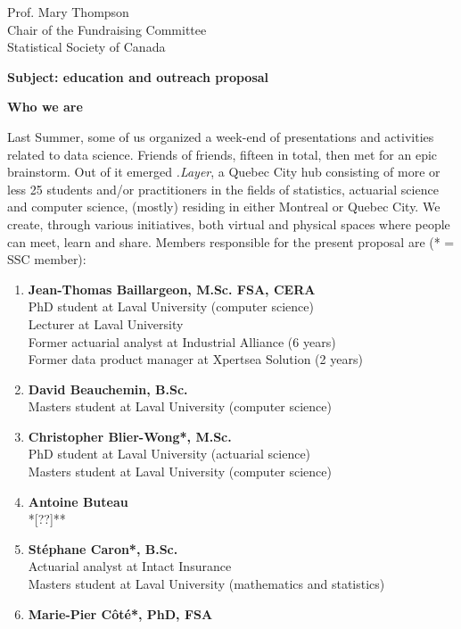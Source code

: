 \documentclass[11pt, a4paper]{letter} %
\begin{document}
\begin{letter}{
	Prof. Mary Thompson\\
	Chair of the Fundraising Committee\\
	Statistical Society of Canada
	
	\bigskip
	\textbf{Subject: education and outreach proposal}%
}
\bigskip
\noindent \textbf{Who we are}

Last Summer, some of us organized a week-end of presentations and activities related to data science. Friends of friends, fifteen in total, then met for an epic brainstorm. %
Out of it emerged \emph{.Layer}, a Quebec City hub consisting of more or less 25 students and/or practitioners in the fields of statistics, actuarial science and computer science, (mostly) residing in either Montreal or Quebec City. We create, through various initiatives, both virtual and physical spaces where people can meet, learn and share. Members responsible for the present proposal are (* = SSC member):
\begin{enumerate}
	\item[] \textbf{Jean-Thomas Baillargeon, M.Sc. FSA, CERA}\\
	\quad PhD student at Laval University (computer science)\\
	\quad Lecturer at Laval University\\
	\quad Former actuarial analyst at Industrial Alliance (6 years)\\
	\quad Former data product manager at Xpertsea Solution (2 years)\\
	\item[] \textbf{David Beauchemin, B.Sc.}\\
	\quad Masters student at Laval University (computer science)
	\item[] \textbf{Christopher Blier-Wong*, M.Sc.}\\
	\quad PhD student at Laval University (actuarial science)\\
	\quad Masters student at Laval University (computer science)
	\item[] \textbf{Antoine Buteau}\\
	\quad **[??]**
	\item[] \textbf{Stéphane Caron*, B.Sc.}\\
	\quad Actuarial analyst at Intact Insurance\\
	\quad Masters student at Laval University (mathematics and statistics)
	\item[] \textbf{Marie-Pier Côté*, PhD, FSA}\\

\end{enumerate}
\end{letter}
\end{document}
